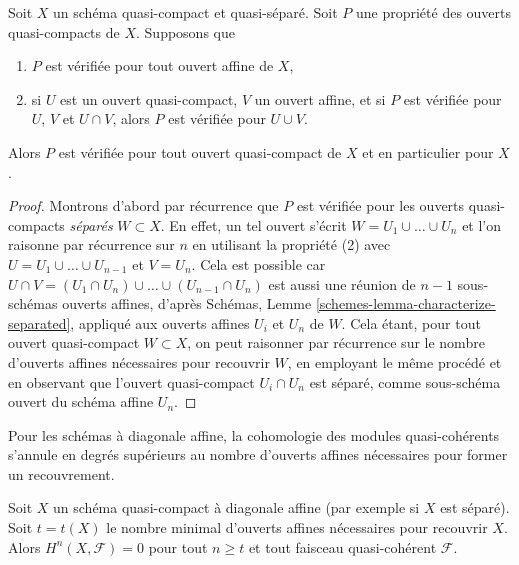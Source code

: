 \begin{lemma}
\label{lemma-induction-principle}
\begin{reference}
\cite[Proposition 3.3.1]{BvdB}
\end{reference}
Soit $X$ un schéma quasi-compact et quasi-séparé. Soit $P$ une propriété
des ouverts quasi-compacts de $X$. Supposons que
\begin{enumerate}
\item $P$ est vérifiée pour tout ouvert affine de $X$,
\item si $U$ est un ouvert quasi-compact, $V$ un ouvert affine,
et si $P$ est vérifiée pour $U$, $V$ et $U \cap V$, alors
$P$ est vérifiée pour $U \cup V$.
\end{enumerate}
Alors $P$ est vérifiée pour tout ouvert quasi-compact de $X$
et en particulier pour $X$.
\end{lemma}

\begin{proof}
Montrons d'abord par récurrence que $P$ est vérifiée pour les ouverts quasi-compacts
{\it séparés} $W \subset X$. En effet, un tel ouvert s'écrit
$W = U_1 \cup \ldots \cup U_n$ et l'on raisonne par récurrence sur $n$ en utilisant
la propriété (2) avec $U = U_1 \cup \ldots \cup U_{n - 1}$ et $V = U_n$.
Cela est possible car
$U \cap V = (U_1 \cap U_n) \cup \ldots \cup (U_{n - 1} \cap U_n)$
est aussi une réunion de $n - 1$ sous-schémas ouverts affines, d'après
Schémas, Lemme \ref{schemes-lemma-characterize-separated},
appliqué aux ouverts affines $U_i$ et $U_n$ de $W$.
Cela étant, pour tout ouvert quasi-compact $W \subset X$, on peut
raisonner par récurrence sur le nombre d'ouverts affines nécessaires pour recouvrir $W$,
en employant le même procédé et en observant que l'ouvert quasi-compact
$U_i \cap U_n$ est séparé, comme sous-schéma ouvert du schéma affine $U_n$.
\end{proof}

\begin{lemma}
\label{lemma-vanishing-nr-affines}
\begin{slogan}
Pour les schémas à diagonale affine, la cohomologie des modules
quasi-cohérents s'annule en degrés supérieurs au nombre d'ouverts
affines nécessaires pour former un recouvrement.
\end{slogan}
Soit $X$ un schéma quasi-compact à diagonale affine (par exemple
si $X$ est séparé).
Soit $t = t(X)$ le nombre minimal d'ouverts affines nécessaires pour
recouvrir $X$. Alors $H^n(X, \mathcal{F}) = 0$ pour tout $n \geq t$ et tout
faisceau quasi-cohérent $\mathcal{F}$.
\end{lemma}

